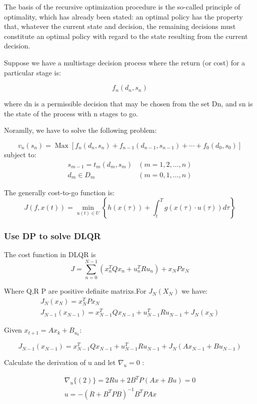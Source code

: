 \documentclass{mcmthesis}
\begin{document}
The basis of the recursive optimization procedure is the so-called principle of optimality, which has already been stated: an optimal policy has the property that, whatever the current state and decision, the remaining decisions must constitute an optimal policy with regard to the state resulting from the current decision.

Suppose we have a multistage decision process where the return (or cost) for a particular stage is:

$$f_n(d_n,s_n)$$

where dn is a permissible decision that may be chosen from the set Dn, and sn is the state of the process with n stages to go.

Noramlly, we have to solve the following problem:

\[
v_{n}\left(s_{n}\right)=\operatorname{Max}\left[f_{n}\left(d_{n}, s_{n}\right)+f_{n-1}\left(d_{n-1}, s_{n-1}\right)+\cdots+f_{0}\left(d_{0}, s_{0}\right)\right]
\]
subject to:
\[
\begin{array}{ll}
s_{m-1}=t_{m}\left(d_{m}, s_{m}\right) & (m=1,2, \ldots, n) \\
d_{m} \in D_{m} & (m=0,1, \ldots, n)
\end{array}
\]

The generally cost-to-go function is:
$$J(f, x(t))=\min _{u(t) \in U}\left\{h(x(\tau))+\int_{t}^{T} g(x(\tau) \cdot u(\tau)) d \tau\right\}$$
\subsubsection{Use DP to solve DLQR}
The cost function in DLQR is
$$J=\sum_{n=0}^{N-1}\left(x_{n}^{T} Q x_{n}+u_{n}^{T} R u_{n}\right)+x_{N} P x_{N}$$

Where  Q,R P are positive definite matrixs.For $J_N(X_N)$ we have:
$$\begin{array}{c}
J_{N}\left(x_{N}\right)=x_{N}^{T} P x_{N} \\
J_{N-1}\left(x_{N-1}\right)=x_{N-1}^{T} Q x_{N-1}+u_{N-1}^{T} R u_{N-1}+J_{N}\left(x_{N}\right)
\end{array}$$ 

Given $x_{t+1}=A x_{k}+B_{u_{k}}$:

$$J_{N-1}\left(x_{N-1}\right)=x_{N-1}^{T} Q x_{N-1}+u_{N-1}^{T} R u_{N-1}+J_{N}\left(A x_{N-1}+B u_{N-1}\right)$$

Calculate the derivation of u and let $\nabla_{u}=0$ :

$$\begin{array}{l}
\nabla_{u}\{(2)\}=2 R u+2 B^{T} P(A x+B u)=0 \\
u=-\left(R+B^{T} P B\right)^{-1} B^{T} P A x
\end{array}$$
\end{document}
